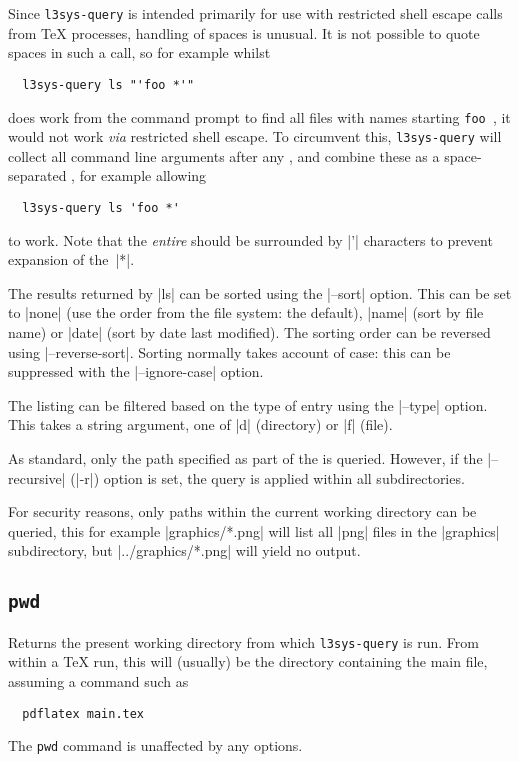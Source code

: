 \documentclass{l3doc}
\begin{document}
\begin{documentation}
Since \texttt{l3sys-query} is intended primarily for use with restricted shell
escape calls from \TeX{} processes, handling of spaces is unusual. It is not
possible to quote spaces in such a call, so for example whilst
\begin{verbatim}
  l3sys-query ls "'foo *'"
\end{verbatim}
does work from the command prompt to find all files with names starting
\verb*|foo |, it would not work \emph{via} restricted shell escape. To
circumvent this, \texttt{l3sys-query} will collect all command line arguments
after any , and combine these as a space-separated ,
for example allowing
\begin{verbatim}
  l3sys-query ls 'foo *'
\end{verbatim}
to work. Note that the \emph{entire}  should be surrounded by |'|
characters to prevent expansion of the~|*|.

The results returned by |ls| can be sorted using the |--sort| option. This can
be set to |none| (use the order from the file system: the default), |name| (sort
by file name) or |date| (sort by date last modified). The sorting order can be
reversed using |--reverse-sort|. Sorting normally takes account of case: this
can be suppressed with the |--ignore-case| option.

The listing can be filtered based on the type of entry using the |--type|
option. This takes a string argument, one of |d| (directory) or |f| (file).

As standard, only the path specified as part of the  is queried.
However, if the |--recursive| (|-r|) option is set, the query is applied within
all subdirectories.

For security reasons, only paths within the current working directory can be
queried, this for example |graphics/*.png| will list all |png| files in the
|graphics| subdirectory, but |../graphics/*.png| will yield no output.

\subsection{\texttt{pwd}}

Returns the present working directory from which \texttt{l3sys-query} is run.
From within a \TeX{} run, this will (usually) be the directory containing the
main file, assuming a command such as
\begin{verbatim}
  pdflatex main.tex
\end{verbatim}
The \texttt{pwd} command is unaffected by any options.


\end{documentation}
\end{document}
